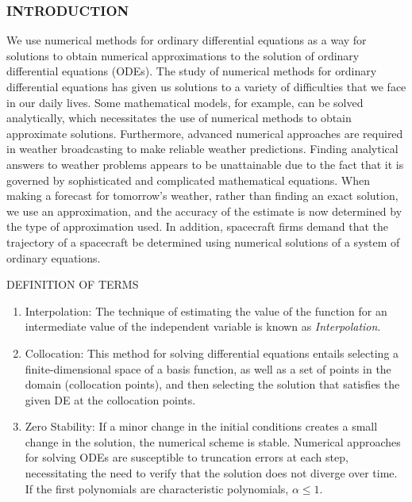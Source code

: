 \documentclass[compress, 19pt, blue]{beamer}
\begin{document}
	\begin{frame}
		\frametitle{\textbf{INTRODUCTION}}
		\color{blue}
We use numerical methods for ordinary differential equations as a way for solutions to obtain numerical approximations to the solution of ordinary differential equations (ODEs). The study of numerical methods for ordinary differential equations has given us solutions to a variety of difficulties that we face in our daily lives. Some mathematical models, for example, can be solved analytically, which necessitates the use of numerical methods to obtain approximate solutions. Furthermore, advanced numerical approaches are required in weather broadcasting to make reliable weather predictions. Finding analytical answers to weather problems appears to be unattainable due to the fact that it is governed by sophisticated and complicated mathematical equations. When making a forecast for tomorrow's weather, rather than finding an exact solution, we use an approximation, and the accuracy of the estimate is now determined by the type of approximation used. In addition, spacecraft firms demand that the trajectory of a spacecraft be determined using numerical solutions of a system of ordinary equations. 
\end{frame}
\begin{frame}{DEFINITION OF TERMS}
	\color{blue}
\begin{enumerate}
	\item Interpolation: The technique of estimating the value of the function for an intermediate value of the independent variable is known as \textsl{Interpolation}.
	\item Collocation: This method for solving differential equations entails selecting a finite-dimensional space of a basis function, as well as a set of points in the domain (collocation points), and then selecting the solution that satisfies the given DE at the collocation points.
	\item Zero Stability: If a minor change in the initial conditions creates a small change in the solution, the numerical scheme is stable. Numerical approaches for solving ODEs are susceptible to truncation errors at each step, necessitating the need to verify that the solution does not diverge over time. If the first polynomials are characteristic polynomials, $\alpha\leq1.$ 
\end{enumerate}

\end{frame}
\end{document}
